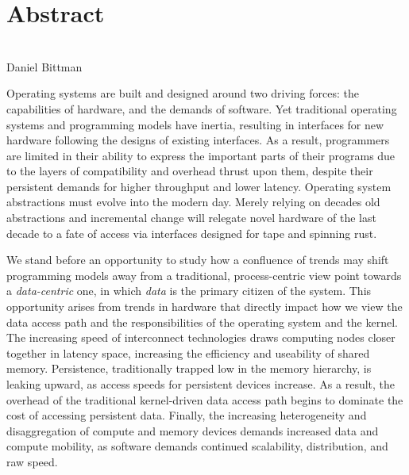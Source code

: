 \begingroup
\let\clearpage\relax
\let\cleardoublepage\relax
\let\cleardoublepage\relax

\chapter*{Abstract}

\begin{center}
    \Large {}\\
    Daniel Bittman
\end{center}
\medskip

Operating systems are built and designed around two driving forces: the capabilities of hardware, and the demands of
software. Yet traditional operating systems and programming models have inertia, resulting
in interfaces for new hardware following the designs of existing interfaces. As a result, programmers are limited in their ability to express
the important parts of their programs due to the layers of compatibility and overhead thrust upon them, despite their
persistent demands for higher throughput and lower latency. Operating system abstractions must evolve into the modern day.
Merely relying on decades old abstractions and incremental change will
relegate novel hardware of the last decade to a fate of access via interfaces designed for tape and spinning rust.

We stand before an opportunity to study how a confluence of trends may shift programming models away from a
traditional, process-centric view point towards a \emph{data-centric} one, in which \emph{data} is the primary citizen
of the system.
This opportunity arises from trends in hardware that directly impact how we view the data access path and the
responsibilities of the operating system and the kernel.
The increasing speed of interconnect technologies draws computing nodes closer together in latency space,
increasing the efficiency and useability of shared memory. Persistence, traditionally trapped low in the memory
hierarchy, is leaking upward, as access speeds for persistent devices increase. As a result,
the overhead of the traditional kernel-driven data access path begins to dominate the cost of accessing persistent data.
Finally, the increasing heterogeneity and disaggregation of compute and memory devices demands increased data and
compute mobility, as software demands continued scalability, distribution, and raw speed.

